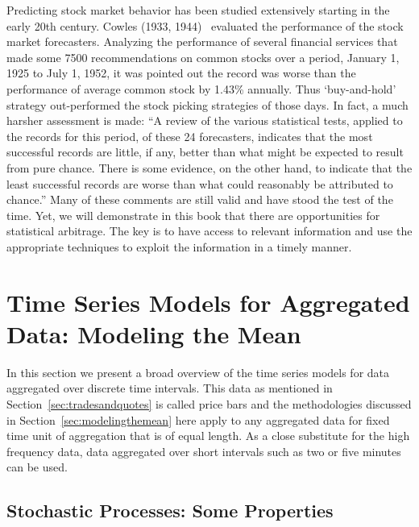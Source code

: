 Predicting stock market behavior has been studied extensively starting in the early 20th century. Cowles (1933, 1944)~\cite{cow2,cow1} evaluated the performance of the stock market forecasters. Analyzing the performance of several financial services that made some 7500 recommendations on common stocks over a period, January 1, 1925 to July 1, 1952, it was pointed out the record was worse than the performance of average common stock by 1.43\% annually. Thus `buy-and-hold' strategy out-performed the stock picking strategies of those days. In fact, a much harsher assessment is made: ``A review of the various statistical tests, applied to the records for this period, of these 24 forecasters, indicates that the most successful records are little, if any, better than what might be expected to result from pure chance. There is some evidence, on the other hand, to indicate that the least successful records are worse than what could reasonably be attributed to chance.'' Many of these comments are still valid and have stood the test of the time. Yet, we will demonstrate in this book that there are opportunities for statistical arbitrage. The key is to have access to relevant information and use the appropriate techniques to exploit the information in a timely manner. 



\section{Time Series Models for Aggregated Data: Modeling the Mean \label{sec:modelingthemean}}

In this section we present a broad overview of the time series models for data aggregated over discrete time intervals. This data as mentioned in Section~\ref{sec:tradesandquotes} is called price bars and the methodologies discussed in Section~\ref{sec:modelingthemean} here apply to any aggregated data for fixed time unit of aggregation that is of equal length. As a close substitute for the high frequency data, data aggregated over short intervals such as two or five minutes can be used.


\subsection{Stochastic Processes: Some Properties}

